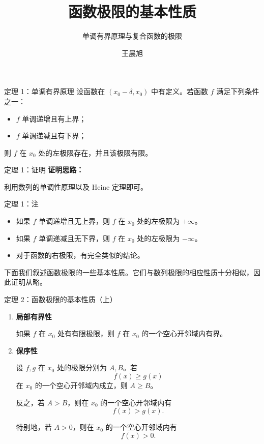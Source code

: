 ﻿\documentclass[aspectratio=169,11pt]{ctexbeamer}
\title{函数极限的基本性质}
\subtitle{单调有界原理与复合函数的极限}
\author{王晨旭}
\date{}
\begin{document}
\begin{frame}
  \titlepage
\end{frame}

\begin{frame}{定理 1：单调有界原理}
设函数在 $(x_0-\delta,x_0)$ 中有定义。若函数 $f$ 满足下列条件之一：
\begin{itemize}
  \item $f$ 单调递增且有上界；
  \item $f$ 单调递减且有下界；
\end{itemize}
则 $f$ 在 $x_0$ 处的左极限存在，并且该极限有限。
\end{frame}

\begin{frame}{定理 1：证明}
\textbf{证明思路：}

利用数列的单调性原理以及 Heine 定理即可。
\end{frame}

\begin{frame}{定理 1：注}
\begin{itemize}
  \item 如果 $f$ 单调递增且无上界，则 $f$ 在 $x_0$ 处的左极限为 $+\infty$。
  \item 如果 $f$ 单调递减且无下界，则 $f$ 在 $x_0$ 处的左极限为 $-\infty$。
  \item 对于函数的右极限，有完全类似的结论。
\end{itemize}

\vspace{0.8em}
下面我们叙述函数极限的一些基本性质。它们与数列极限的相应性质十分相似，因此证明从略。
\end{frame}

\begin{frame}{定理 2：函数极限的基本性质（上）}
\begin{enumerate}
  \item \textbf{局部有界性}\par
  如果 $f$ 在 $x_0$ 处有有限极限，则 $f$ 在 $x_0$ 的一个空心开邻域内有界。

  \item \textbf{保序性}\par
  设 $f,g$ 在 $x_0$ 处的极限分别为 $A,B$。若
  \[
    f(x)\ge g(x)
  \]
  在 $x_0$ 的一个空心开邻域内成立，则 $A\ge B$。

  反之，若 $A>B$，则在 $x_0$ 的一个空心开邻域内有
  \[
    f(x)>g(x).
  \]

  特别地，若 $A>0$，则在 $x_0$ 的一个空心开邻域内有
  \[
    f(x)>0.
  \]
\end{enumerate}
\end{frame}
\end{document}
